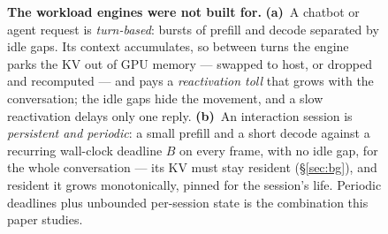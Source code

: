 \begin{figure}[t]
{}
\caption{\textbf{The workload engines were not built for.} \textbf{(a)}~A chatbot or agent request is
\emph{turn-based}: bursts of prefill and decode separated by idle gaps. Its context accumulates, so
between turns the engine parks the KV out of GPU memory --- swapped to host, or dropped and
recomputed --- and pays a \emph{reactivation toll} that grows with the conversation; the idle gaps hide
the movement, and a slow reactivation delays only one reply. \textbf{(b)}~An interaction session is
\emph{persistent and periodic}: a small prefill and a short decode against a recurring wall-clock
deadline $B$ on every frame, with no idle gap, for the whole conversation --- its KV must stay resident
(\S\ref{sec:bg}), and resident it grows monotonically, pinned for the session's life. Periodic
deadlines plus unbounded per-session state is the combination this paper studies.}
\label{fig:workload}
\end{figure}
